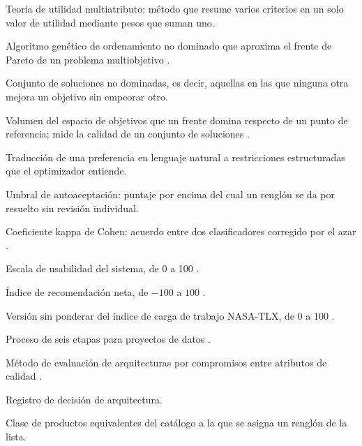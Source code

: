 \begin{description}[leftmargin=2.5cm,style=nextline]
\item[MAUT] Teoría de utilidad multiatributo: método que resume varios criterios en un solo valor de utilidad mediante pesos que suman uno.
\item[NSGA-II] Algoritmo genético de ordenamiento no dominado que aproxima el frente de Pareto de un problema multiobjetivo \citep{deb_fast_2002}.
\item[Frente de Pareto] Conjunto de soluciones no dominadas, es decir, aquellas en las que ninguna otra mejora un objetivo sin empeorar otro.
\item[Hipervolumen] Volumen del espacio de objetivos que un frente domina respecto de un punto de referencia; mide la calidad de un conjunto de soluciones \citep{zitzler_multiobjective_1999}.
\item[NL2C] Traducción de una preferencia en lenguaje natural a restricciones estructuradas que el optimizador entiende.
\item[$\tau$] Umbral de autoaceptación: puntaje por encima del cual un renglón se da por resuelto sin revisión individual.
\item[$\kappa$] Coeficiente kappa de Cohen: acuerdo entre dos clasificadores corregido por el azar \citep{cohen_coefficient_1960}.
\item[SUS] Escala de usabilidad del sistema, de 0 a 100 \citep{brooke_sus_1996}.
\item[NPS] Índice de recomendación neta, de $-100$ a $100$ \citep{reichheld_one_2003}.
\item[RTLX] Versión sin ponderar del índice de carga de trabajo NASA-TLX, de 0 a 100 \citep{hart_development_1988,hart_nasa_2006}.
\item[CRISP-DM] Proceso de seis etapas para proyectos de datos \citep{chapman_crisp-dm_2000,wirth_crisp-dm_2000}.
\item[ATAM] Método de evaluación de arquitecturas por compromisos entre atributos de calidad \citep{bass_software_2021}.
\item[ADR] Registro de decisión de arquitectura.
\item[Concepto canónico] Clase de productos equivalentes del catálogo a la que se asigna un renglón de la lista.
\end{description}


